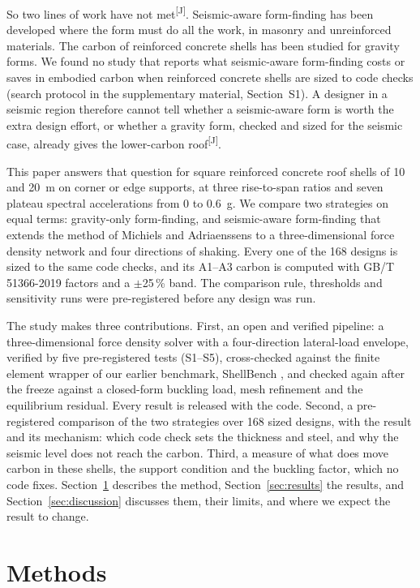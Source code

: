 \documentclass[preprint,12pt]{elsarticle}
\newcommand{\jud}{\textsuperscript{\textcolor{markcol}{\sffamily\scriptsize[J]}}}
\newcommand{\jud}{}
\begin{document}
So two lines of work have not met\jud. Seismic-aware form-finding has been developed where the form must do all the work, in masonry and unreinforced materials. The carbon of reinforced concrete shells has been studied for gravity forms. We found no study that reports what seismic-aware form-finding costs or saves in embodied carbon when reinforced concrete shells are sized to code checks (search protocol in the supplementary material, Section~S1). A designer in a seismic region therefore cannot tell whether a seismic-aware form is worth the extra design effort, or whether a gravity form, checked and sized for the seismic case, already gives the lower-carbon roof\jud.

This paper answers that question for square reinforced concrete roof shells of 10 and 20~m on corner or edge supports, at three rise-to-span ratios and seven plateau spectral accelerations from 0 to 0.6~g. We compare two strategies on equal terms: gravity-only form-finding, and seismic-aware form-finding that extends the method of Michiels and Adriaenssens to a three-dimensional force density network and four directions of shaking. Every one of the 168 designs is sized to the same code checks, and its A1--A3 carbon is computed with GB/T 51366-2019 factors \cite{GBT51366} and a $\pm$25\,\% band. The comparison rule, thresholds and sensitivity runs were pre-registered before any design was run.

The study makes three contributions. First, an open and verified pipeline: a three-dimensional force density solver with a four-direction lateral-load envelope, verified by five pre-registered tests (S1--S5), cross-checked against the finite element wrapper of our earlier benchmark, ShellBench \cite{ShellBench}, and checked again after the freeze against a closed-form buckling load, mesh refinement and the equilibrium residual. Every result is released with the code. Second, a pre-registered comparison of the two strategies over 168 sized designs, with the result and its mechanism: which code check sets the thickness and steel, and why the seismic level does not reach the carbon. Third, a measure of what does move carbon in these shells, the support condition and the buckling factor, which no code fixes. Section~\ref{sec:methods} describes the method, Section~\ref{sec:results} the results, and Section~\ref{sec:discussion} discusses them, their limits, and where we expect the result to change.

\section{Methods}\label{sec:methods}
\end{document}

